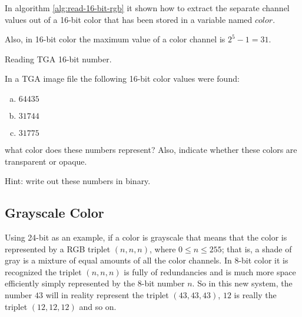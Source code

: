 In algorithm \ref{alg:read-16-bit-rgb} it shown how to extract the
separate channel values out of a 16-bit color that has been stored in
a variable named $color$.

Also, in 16-bit color the maximum value of a color channel is $2^5 - 1
= 31$.

\begin{algorithm}[H]
  \caption{Reading TGA 16-bit number.}
  \label{alg:read-16-bit-rgb}
  \begin{algorithmic}[1]
  \end{algorithmic}
\end{algorithm}

\begin{Exercise}[label={tga-16-bit}]

  In a TGA image file the following 16-bit color values were found:

  \begin{enumerate}[(a)]
  \item $64435$
  \item $31744$
  \item $31775$
  \end{enumerate}

  what color does these numbers represent? Also, indicate whether
  these colors are transparent or opaque.

  Hint: write out these numbers in binary.

\end{Exercise}


\subsection{Grayscale Color}

\newcommand{\selfrgbtrip}[3]{\mbox{\textcolor[RGB]{#1,#2,#3}{(#1,#2,#3)}}}
\newcommand{\selfrgbtripgray}[1]{\selfrgbtrip{#1}{#1}{#1}}

Using 24-bit as an example, if a color is grayscale that means that
the color is represented by a RGB triplet $(n,n,n)$, where $0 \le n
\le 255$; that is, a shade of gray is a mixture of equal amounts of
all the color channels. In 8-bit color it is recognized the triplet
$(n,n,n)$ is fully of redundancies and is much more space efficiently
simply represented by the 8-bit number $n$. So in this new system, the
number $43$ will in reality represent the triplet $(43,43,43)$, $12$
is really the triplet $(12,12,12)$ and so on.

